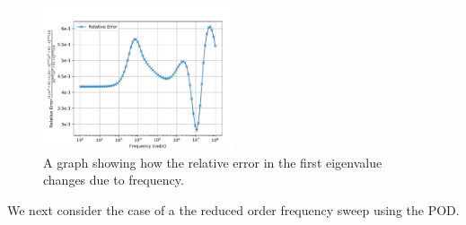 \begin{figure}[H]
\begin{center}
\includegraphics[width=0.5\textwidth]{Figures/FullError/FullError.pdf}
\caption{A graph showing how the relative error in the first eigenvalue changes due to frequency.}\label{fig:FullOrderSphereError}
\end{center}
\end{figure}
\noindent
We next consider the case of a the reduced order frequency sweep using the POD.
